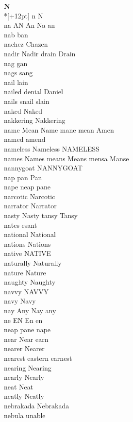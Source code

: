 \vspace{14pt}
\noindent\textbf{\Large N}\\*[+12pt]
n N\\
na AN An Na an\\
nab ban\\
nachez Chazen\\
nadir Nadir drain Drain\\
nag gan\\
nags sang\\
nail lain\\
nailed denial Daniel\\
nails snail slain\\
naked Naked\\
nakkering Nakkering\\
name Mean Name mane mean Amen\\
named amend\\
nameless Nameless NAMELESS\\
names Names means Means mensa Manse\\
nannygoat NANNYGOAT\\
nap pan Pan\\
nape neap pane\\
narcotic Narcotic\\
narrator Narrator\\
nasty Nasty tansy Tansy\\
nates esant\\
national National\\
nations Nations\\
native NATIVE\\
naturally Naturally\\
nature Nature\\
naughty Naughty\\
navvy NAVVY\\
navy Navy\\
nay Any Nay any\\
ne EN En en\\
neap pane nape\\
near Near earn\\
nearer Nearer\\
nearest eastern earnest\\
nearing Nearing\\
nearly Nearly\\
neat Neat\\
neatly Neatly\\
nebrakada Nebrakada\\
nebula unable\\
